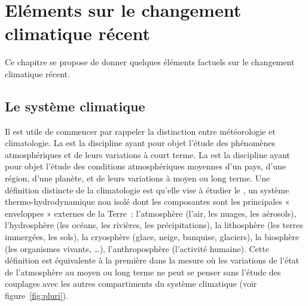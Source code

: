 \chapter{Eléments sur le changement climatique récent}


\bk
Ce chapitre se propose de donner quelques éléments factuels sur le changement climatique récent. 

\mk
\section{Le système climatique}

\sk
Il est utile de commencer par rappeler la distinction entre météorologie et climatologie. La  est la discipline ayant pour objet l'étude des phénomènes atmosphériques et de leurs variations à court terme. La  est la discipline ayant pour objet l'étude des conditions atmosphériques moyennes d'un pays, d'une région, d'une planète, et de leurs variations à moyen ou long terme. Une définition distincte de la climatologie est qu'elle vise à étudier le , un système thermo-hydrodynamique non isolé dont les composantes sont les principales « enveloppes » externes de la Terre~: l'atmosphère (l’air, les nuages, les aérosols), l’hydrosphère (les océans, les rivières, les précipitations), la lithosphère (les terres immergées, les sols), la cryosphère (glace, neige, banquise, glaciers), la biosphère (les organismes vivants, \ldots), l’anthroposphère (l’activité humaine). Cette définition est équivalente à la première dans la mesure où les variations de l'état de l'atmosphère au moyen ou long terme ne peut se penser sans l'étude des couplages avec les autres compartiments du système climatique (voir figure~\ref{fig:pluri}). 


